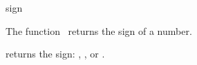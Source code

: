 \begin{ccRefFunction}{sign}

\ccDefinition

The function \ccRefName\ returns the sign of a number.


{returns the sign: , , or .}

\end{ccRefFunction}
